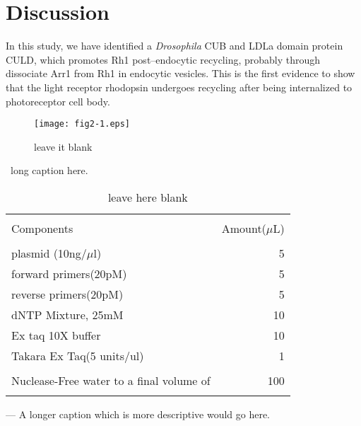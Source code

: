 \section{Discussion}
In this study, we have identified a \textit{Drosophila} CUB and LDLa domain protein CULD, which promotes Rh1 post--endocytic recycling, probably through dissociate Arr1 from Rh1 in endocytic vesicles. This is the first evidence to show that the light receptor rhodopsin undergoes recycling after being internalized to photoreceptor cell body. 

\begin{figure}
	\centering
		\texttt{[image: fig2-1.eps]}
	\caption[short test]{leave it blank}
	\label{fig:fig3-1}
\end{figure}
\clearpage {}~long caption here.\clearpage

\begin{table}
	\caption[Short caption for the List of Table]{leave here blank}
	\centering
		\begin{tabular}{lr}
		\hline\\
			Components&Amount($\mu$L)\\
			\hline\\
			plasmid (10ng/$\mu$l) & 5\\
			forward primers(20pM) & 5\\
			reverse primers(20pM) & 5\\
			dNTP Mixture, 25mM & 10\\
			Ex taq 10X buffer & 10\\
			Takara Ex Taq(5 units/ul) & 1\\
			\hline\\
			Nuclease-Free water to a final volume of & 100\\
		\hline\\
		\end{tabular}
	\label{tab:Amplification}
\end{table}
\clearpage {}--- A longer caption which is more descriptive would go here.\clearpage